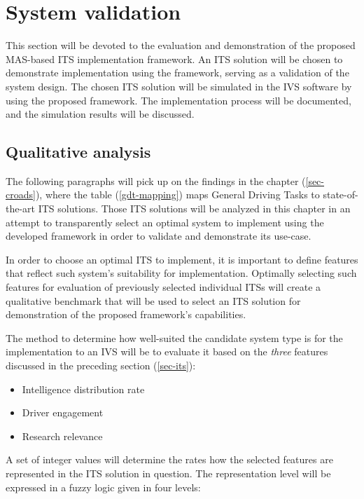 \documentclass[main.tex]{subfiles}
\begin{document}
\section{System validation} \label{sec-validation}

This section will be devoted to the evaluation and demonstration of the proposed MAS-based ITS
implementation framework. An ITS solution will be chosen to demonstrate implementation using 
the framework, serving as a validation of the system design. The chosen ITS solution will be simulated
in the IVS software by using the proposed framework. The implementation process will be documented, 
and the simulation results will be discussed.

\subsection{Qualitative analysis}

The following paragraphs will pick up on the findings in the chapter (\ref{sec-croads}), where the
table (\ref{gdt-mapping}) maps General Driving Tasks to state-of-the-art ITS solutions. Those
ITS solutions will be analyzed in this chapter in an attempt to transparently select an optimal
system to implement using the developed framework in order to validate and demonstrate its
use-case. 

In order to choose an optimal ITS to implement, it is important to define features that 
reflect such system's suitability for implementation. Optimally selecting such features 
for evaluation of previously selected individual ITSs will create a qualitative benchmark that
will be used to select an ITS solution for demonstration of the proposed framework's
capabilities.

The method to determine how well-suited the candidate system type is for the implementation to
an IVS will be to evaluate it based on the \emph{three} features discussed in the preceding
section (\ref{sec-its}): 

\begin{itemize}
    \item Intelligence distribution rate
    \item Driver engagement
    \item Research relevance
\end{itemize}

A set of integer values will determine the rates how the selected features are represented in the 
ITS solution in question. The representation level will be expressed in a fuzzy logic given in four levels:
\end{document}
